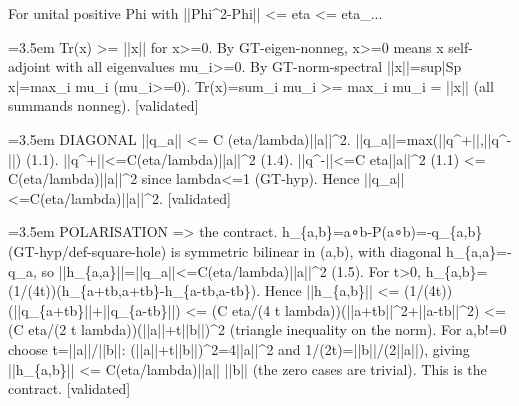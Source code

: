 \documentclass{article}
\newcommand{\step}[1]{\par\noindent\hangindent=3.5em\hangafter=1%
  \makebox[3.5em][l]{\textbf{#1.}}}
\newcommand{\steptag}[1]{\hfill{\small\textsf{[#1]}}}
\begin{document}
\begin{proofbox}{For unital positive Phi with ||Phi\textasciicircum{}2-Phi|| <= eta <= eta\_...}
\step{1.4.2} Tr(x) >= ||x|| for x>=0. By GT-eigen-nonneg, x>=0 means x self-adjoint with all eigenvalues mu\_i>=0. By GT-norm-spectral ||x||=sup|Sp x|=max\_i mu\_i (mu\_i>=0). Tr(x)=sum\_i mu\_i >= max\_i mu\_i = ||x|| (all summands nonneg). \steptag{validated} \\[4pt]
\step{1.5} DIAGONAL ||q\_a|| <= C (eta/lambda)||a||\textasciicircum{}2. ||q\_a||=max(||q\textasciicircum{}+||,||q\textasciicircum{}-||) (1.1). ||q\textasciicircum{}+||<=C(eta/lambda)||a||\textasciicircum{}2 (1.4). ||q\textasciicircum{}-||<=C eta||a||\textasciicircum{}2 (1.1) <= C(eta/lambda)||a||\textasciicircum{}2 since lambda<=1 (GT-hyp). Hence ||q\_a||<=C(eta/lambda)||a||\textasciicircum{}2. \steptag{validated} \\[4pt]
\step{1.6} POLARISATION => the contract. h\_\{a,b\}=a∘b-P(a∘b)=-q\_\{a,b\} (GT-hyp/def-square-hole) is symmetric bilinear in (a,b), with diagonal h\_\{a,a\}=-q\_a, so ||h\_\{a,a\}||=||q\_a||<=C(eta/lambda)||a||\textasciicircum{}2 (1.5). For t>0, h\_\{a,b\}=(1/(4t))(h\_\{a+tb,a+tb\}-h\_\{a-tb,a-tb\}). Hence ||h\_\{a,b\}|| <= (1/(4t))(||q\_\{a+tb\}||+||q\_\{a-tb\}||) <= (C eta/(4 t lambda))(||a+tb||\textasciicircum{}2+||a-tb||\textasciicircum{}2) <= (C eta/(2 t lambda))(||a||+t||b||)\textasciicircum{}2 (triangle inequality on the norm). For a,b!=0 choose t=||a||/||b||: (||a||+t||b||)\textasciicircum{}2=4||a||\textasciicircum{}2 and 1/(2t)=||b||/(2||a||), giving ||h\_\{a,b\}|| <= C(eta/lambda)||a|| ||b|| (the zero cases are trivial). This is the contract. \steptag{validated} \\[4pt]
\end{proofbox}
\end{document}
